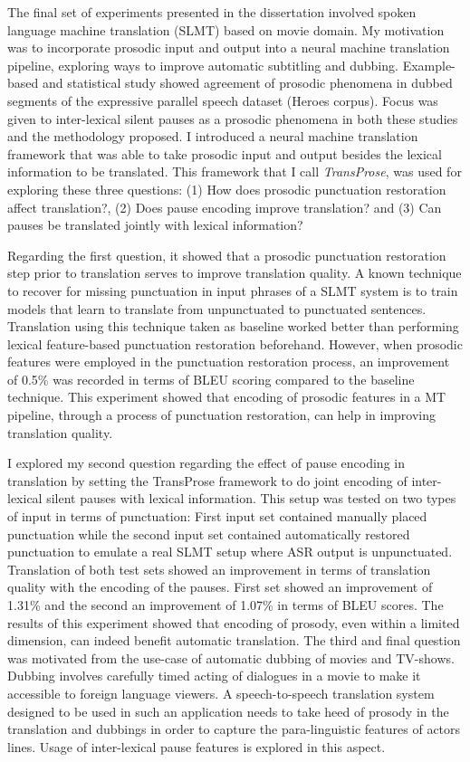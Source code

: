 The final set of experiments presented in the dissertation involved spoken language machine translation (SLMT) based on movie domain. My motivation was to incorporate prosodic input and output into a neural machine translation pipeline, exploring ways to improve automatic subtitling and dubbing. Example-based and statistical study showed agreement of prosodic phenomena in dubbed segments of the expressive parallel speech dataset (Heroes corpus). Focus was given to inter-lexical silent pauses as a prosodic phenomena in both these studies and the methodology proposed. I introduced a neural machine translation framework that was able to take prosodic input and output besides the lexical information to be translated. This framework that I call \textit{TransProse}, was used for exploring these three questions: (1) How does prosodic punctuation restoration affect translation?, (2) Does pause encoding improve translation? and (3) Can pauses be translated jointly with lexical information? 

Regarding the first question, it showed that a prosodic punctuation restoration step prior to translation serves to improve translation quality. A known technique to recover for missing punctuation in input phrases of a SLMT system is to train models that learn to translate from unpunctuated to punctuated sentences. Translation using this technique taken as baseline worked better than performing lexical feature-based punctuation restoration beforehand. However, when prosodic features were employed in the punctuation restoration process, an improvement of 0.5\% was recorded in terms of BLEU scoring compared to the baseline technique. This experiment showed that encoding of prosodic features in a MT pipeline, through a process of punctuation restoration, can help in improving translation quality. 

I explored my second question regarding the effect of pause encoding in translation by setting the TransProse framework to do joint encoding of inter-lexical silent pauses with lexical information. This setup was tested on two types of input in terms of punctuation: First input set contained manually placed punctuation while the second input set contained automatically restored punctuation to emulate a real SLMT setup where ASR output is unpunctuated. Translation of both test sets showed an improvement in terms of translation quality with the encoding of the pauses. First set showed an improvement of 1.31\% and the second an improvement of 1.07\% in terms of BLEU scores. The results of this experiment showed that encoding of prosody, even within a limited dimension, can indeed benefit automatic translation.  
The third and final question was motivated from the use-case of automatic dubbing of movies and TV-shows. Dubbing involves carefully timed acting of dialogues in a movie to make it accessible to foreign language viewers. A speech-to-speech translation system designed to be used in such an application needs to take heed of prosody in the translation and dubbings in order to capture the para-linguistic features of actors lines. Usage of inter-lexical pause features is explored in this aspect. 

